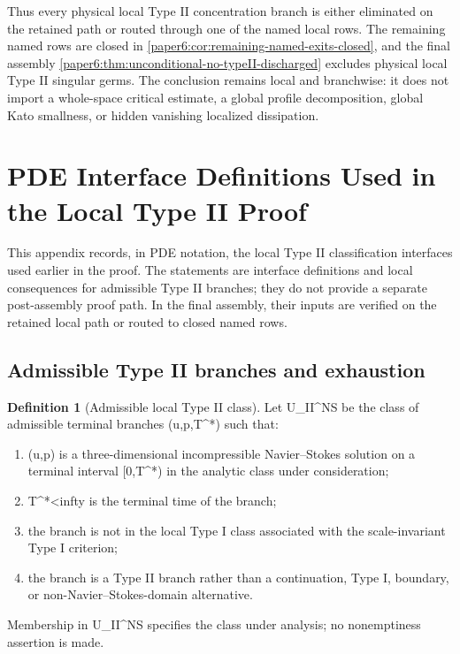 \documentclass[11pt]{amsart}
\def\({}%
\def\){}%
\def\mathrm#1{#1}%
\def\infty{infty}%
\theoremstyle{plain}
\theoremstyle{definition}
\newtheorem{definition}[definition]{Definition}
\theoremstyle{remark}
\begin{document}
Thus every physical local Type II concentration branch is either eliminated on
the retained path or routed through one of the named local rows.  The remaining
named rows are closed in
\cref{paper6:cor:remaining-named-exits-closed}, and the final assembly
\cref{paper6:thm:unconditional-no-typeII-discharged} excludes physical local
Type II singular germs.  The conclusion remains local and branchwise: it does
not import a whole-space critical estimate, a global profile decomposition,
global Kato smallness, or hidden vanishing localized dissipation.


\clearpage
\appendix
\section{PDE Interface Definitions Used in the Local Type II Proof}
\label{sec:c1-c5-pde-translation}

This appendix records, in PDE notation, the local Type II classification
interfaces used earlier in the proof.  The statements are interface definitions
and local consequences for admissible Type II branches; they do not provide a
separate post-assembly proof path.  In the final assembly, their inputs are
verified on the retained local path or routed to closed named rows.

\subsection{Admissible Type II branches and exhaustion}

\begin{definition}[Admissible local Type II class]
\label{def:c1-admissible-typeII-class}
Let \(\mathcal U_{\mathrm{II}}^{NS}\) be the class of admissible terminal
branches \((u,p,T^*)\) such that:
\begin{enumerate}[label=\textup{(\roman*)}]
\item \((u,p)\) is a three-dimensional incompressible Navier--Stokes solution
on a terminal interval \([0,T^*)\) in the analytic class under consideration;
\item \(T^*<\infty\) is the terminal time of the branch;
\item the branch is not in the local Type I class associated with the
scale-invariant Type I criterion;
\item the branch is a Type II branch rather than a continuation, Type I,
boundary, or non-Navier--Stokes-domain alternative.
\end{enumerate}
Membership in \(\mathcal U_{\mathrm{II}}^{NS}\) specifies the class under
analysis; no nonemptiness assertion is made.
\end{definition}
\end{document}
